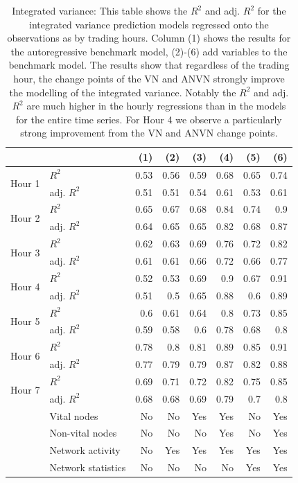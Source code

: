 \begin{table}[ht]
\centering
\caption{Integrated variance: This table shows the $R^2$ and adj. $R^2$ for the integrated variance prediction models regressed onto the observations 
                     as by trading hours. Column (1) shows the results for the autoregressive benchmark model, (2)-(6) add variables to the benchmark model. The results show that regardless of the trading hour, the change points of the VN and ANVN strongly 
                     improve the modelling of the integrated variance. Notably the $R^2$ and adj. $R^2$ are much higher in the hourly regressions than 
                     in the models for the entire time series. For Hour 4 we observe a particularly strong improvement from the VN and ANVN change points.} 
\label{table_hourly_IV}
\begingroup\scriptsize
\begin{tabular}{ll|rrrrrr}
   &   & (1) & (2) & (3) & (4) & (5) & (6) \\ 
  \hline
\multirow{2}{*}{Hour 1} & $R^2$ & 0.53 & 0.56 & 0.59 & 0.68 & 0.65 & 0.74 \\ 
    & adj. $R^2$ & 0.51 & 0.51 & 0.54 & 0.61 & 0.53 & 0.61 \\ 
   \hline
\multirow{2}{*}{Hour 2} & $R^2$ & 0.65 & 0.67 & 0.68 & 0.84 & 0.74 & 0.9 \\ 
    & adj. $R^2$ & 0.64 & 0.65 & 0.65 & 0.82 & 0.68 & 0.87 \\ 
   \hline
\multirow{2}{*}{Hour 3} & $R^2$ & 0.62 & 0.63 & 0.69 & 0.76 & 0.72 & 0.82 \\ 
    & adj. $R^2$ & 0.61 & 0.61 & 0.66 & 0.72 & 0.66 & 0.77 \\ 
   \hline
\multirow{2}{*}{Hour 4} & $R^2$ & 0.52 & 0.53 & 0.69 & 0.9 & 0.67 & 0.91 \\ 
    & adj. $R^2$ & 0.51 & 0.5 & 0.65 & 0.88 & 0.6 & 0.89 \\ 
   \hline
\multirow{2}{*}{Hour 5} & $R^2$ & 0.6 & 0.61 & 0.64 & 0.8 & 0.73 & 0.85 \\ 
    & adj. $R^2$ & 0.59 & 0.58 & 0.6 & 0.78 & 0.68 & 0.8 \\ 
   \hline
\multirow{2}{*}{Hour 6} & $R^2$ & 0.78 & 0.8 & 0.81 & 0.89 & 0.85 & 0.91 \\ 
    & adj. $R^2$ & 0.77 & 0.79 & 0.79 & 0.87 & 0.82 & 0.88 \\ 
   \hline
\multirow{2}{*}{Hour 7} & $R^2$ & 0.69 & 0.71 & 0.72 & 0.82 & 0.75 & 0.85 \\ 
    & adj. $R^2$ & 0.68 & 0.68 & 0.69 & 0.79 & 0.7 & 0.8 \\ 
   \hline & Vital nodes & No & No & Yes & Yes & No & Yes \\ & Non-vital nodes & No & No & No & Yes & No & Yes \\ & Network activity & No & Yes & Yes & Yes & Yes & Yes \\ & Network statistics & No & No & No & No & Yes & Yes \\ \hline
\hline
\end{tabular}
\endgroup
\end{table}
